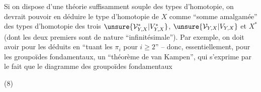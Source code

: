 
Si on dispose d'une théorie suffisamment souple des types d'homotopie, on devrait pouvoir en déduire le type d'homotopie de $X$ comme ``somme amalgamée'' des types d'homotopie des trois  $\unsure{\mathcal V_{Y,X}^*|V_{Y,X}^*}$, $\unsure{\mathcal V_{Y,X}|V_{Y,X}}$ et $X^*$ (dont les deux premiers sont de nature ``infinitésimale''). Par exemple, on doit avoir pour les  déduits en ``tuant les $\pi_i$ pour $i\geq2$'' -- donc, essentiellement, pour les groupoïdes fondamentaux, un ``théorème de van Kampen'', qui s'exprime par le fait que le diagramme des groupoïdes fondamentaux

(8)

